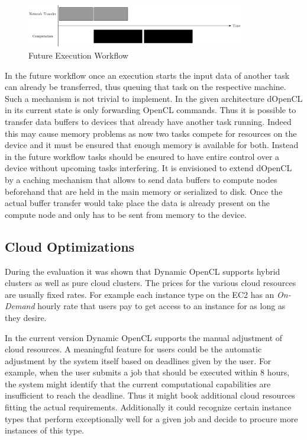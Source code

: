 \begin{figure}[!htb]	
	\includegraphics[width=0.85\textwidth]{drawings/active_queue.pdf}
	\centering
	\caption{Future Execution Workflow}
	\label{img:active_queueing}
\end{figure}

In the future workflow once an execution starts the input data of another task can already be transferred, thus queuing that task on the respective machine. Such a mechanism is not trivial to implement. In the given architecture dOpenCL in its current state is only forwarding OpenCL commands. Thus it is possible to transfer data buffers to devices that already have another task running. Indeed this may cause memory problems as now two tasks compete for resources on the device and it must be ensured that enough memory is available for both. Instead in the future workflow tasks should be ensured to have entire control over a device without upcoming tasks interfering. It is envisioned to extend dOpenCL by a caching mechanism that allows to send data buffers to compute nodes beforehand that are held in the main memory or serialized to disk. Once the actual buffer transfer would take place the data is already present on the compute node and only has to be sent from memory to the device.

\subsection{Cloud Optimizations}

During the evaluation it was shown that Dynamic OpenCL supports hybrid clusters as well as pure cloud clusters. The prices for the various cloud resources are usually fixed rates. For example each instance type on the EC2 has an \textit{On-Demand} hourly rate that users pay to get access to an instance for as long as they desire. 

In the current version Dynamic OpenCL supports the manual adjustment of cloud resources. A meaningful feature for users could be the automatic adjustment by the system itself based on deadlines given by the user. For example, when the user submits a job that should be executed within 8 hours, the system might identify that the current computational capabilities are insufficient to reach the deadline. Thus it might book additional cloud resources fitting the actual requirements. Additionally it could recognize certain instance types that perform exceptionally well for a given job and decide to procure more instances of this type.

